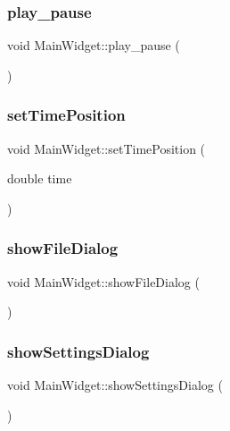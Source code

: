 \subsubsection{\texorpdfstring{play\+\_\+pause}{play\_pause}}
{\footnotesize\ttfamily void Main\+Widget\+::play\+\_\+pause (\begin{DoxyParamCaption}{ }\end{DoxyParamCaption})\hspace{0.3cm}{\ttfamily [slot]}}

\hypertarget{class_main_widget_a977bb230bb404db9b34b7c3b2bf412f1}{}\label{class_main_widget_a977bb230bb404db9b34b7c3b2bf412f1} 
\subsubsection{\texorpdfstring{set\+Time\+Position}{setTimePosition}}
{\footnotesize\ttfamily void Main\+Widget\+::set\+Time\+Position (\begin{DoxyParamCaption}\item[{double}]{time }\end{DoxyParamCaption})\hspace{0.3cm}{\ttfamily [slot]}}

\hypertarget{class_main_widget_a6dd4b8c9d62111904f92ae4cbd3de0ea}{}\label{class_main_widget_a6dd4b8c9d62111904f92ae4cbd3de0ea} 
\subsubsection{\texorpdfstring{show\+File\+Dialog}{showFileDialog}}
{\footnotesize\ttfamily void Main\+Widget\+::show\+File\+Dialog (\begin{DoxyParamCaption}{ }\end{DoxyParamCaption})\hspace{0.3cm}{\ttfamily [slot]}}

\hypertarget{class_main_widget_a532dd01044abf04081c575470c89be17}{}\label{class_main_widget_a532dd01044abf04081c575470c89be17} 
\subsubsection{\texorpdfstring{show\+Settings\+Dialog}{showSettingsDialog}}
{\footnotesize\ttfamily void Main\+Widget\+::show\+Settings\+Dialog (\begin{DoxyParamCaption}{ }\end{DoxyParamCaption})\hspace{0.3cm}{\ttfamily [slot]}}

